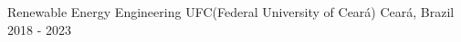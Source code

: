 

\begin{cventries}

  \cventry
    {Renewable Energy Engineering} %
    {UFC(Federal University of Ceará)} %
    {Ceará, Brazil} %
    {2018 - 2023} %
    {
      \begin{cvitems} %
      \end{cvitems}
    }

\end{cventries}
